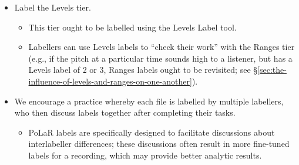 \documentclass[11pt, twoside]{memoir}
\begin{document}
\begin{itemize}
\begin{itemize}
		\end{itemize}
		\item Label the Levels tier.
		\begin{itemize}
			\item This tier ought to be labelled using the Levels Label tool.
			\item Labellers can use Levels labels to “check their work” with the Ranges tier (e.g., if the pitch at a particular time sounds high to a listener, but has a Levels label of 2 or 3, Ranges labels ought to be revisited; see §\ref{sec:the-influence-of-levels-and-ranges-on-one-another}).
		\end{itemize}
		\item We encourage a practice whereby each file is labelled by multiple labellers, who then discuss labels together after completing their tasks.
		\begin{itemize}
			\item PoLaR labels are specifically designed to facilitate discussions about interlabeller differences; these discussions often result in more fine-tuned labels for a recording, which may provide better analytic results.
		\end{itemize}
	\end{itemize}
\end{document}
